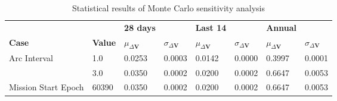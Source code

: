 \begin{table}[h!]
\centering
\begin{tabular}{llllllll}
 &  & \cellcolor[HTML]{EFEFEF}\textbf{28 days} &  & \cellcolor[HTML]{EFEFEF}\textbf{Last 14} & & \cellcolor[HTML]{EFEFEF}\textbf{Annual} \\
\rowcolor[HTML]{EFEFEF} 
\textbf{Case} & \textbf{Value} & \textbf{$\mu_{\Delta \boldsymbol{V}}$} & \textbf{$\sigma_{\Delta \boldsymbol{V}}$} & \textbf{$\mu_{\Delta \boldsymbol{V}}$} & \textbf{$\sigma_{\Delta \boldsymbol{V}}$} & \textbf{$\mu_{\Delta \boldsymbol{V}}$} & \textbf{$\sigma_{\Delta \boldsymbol{V}}$} \\ 
Arc Interval & 1.0 & 0.0253 & 0.0003 & 0.0142 & 0.0000 & 0.3997 & 0.0001 \\ 
 & 3.0 & 0.0350 & 0.0002 & 0.0200 & 0.0002 & 0.6647 & 0.0053 \\ 
Mission Start Epoch & 60390 & 0.0350 & 0.0002 & 0.0200 & 0.0002 & 0.6647 & 0.0053 \\ 
\end{tabular}
\caption{Statistical results of Monte Carlo sensitivity analysis}
\label{tab:SensitivityAnalysis}
\end{table}